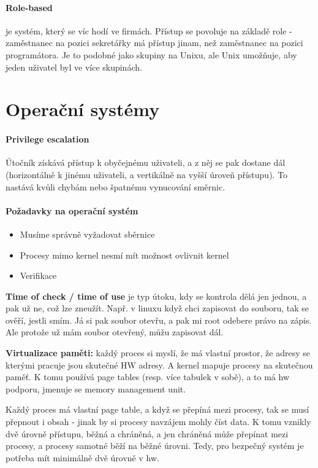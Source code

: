 \paragraph{Role-based} je systém, který se víc hodí ve firmách. Přístup se povoluje na základě role - zaměstnanec na pozici sekretářky má přístup jinam, než zaměstnanec na pozici programátora. Je to podobné jako skupiny na Unixu, ale Unix umožňuje, aby jeden uživatel byl ve více skupinách.




\section{Operační systémy}


\paragraph{Privilege escalation}

Útočník získává přístup k obyčejnému uživateli, a z něj se pak dostane dál (horizontálně k jinému uživateli, a vertikálně na vyšší úroveň přístupu). To nastává kvůli chybám nebo špatnému vynucování směrnic.

\paragraph{Požadavky na operační systém}
\begin{itemize}
\item Musíme správně vyžadovat sběrnice
\item Procesy mimo kernel nesmí mít možnost ovlivnit kernel
\item Verifikace
\end{itemize}

\textbf{Time of check / time of use} je typ útoku, kdy se kontrola dělá jen jednou, a pak už ne, což lze zneužít. Např. v linuxu když chci zapisovat do souboru, tak se ověří, jestli smím. Já si pak soubor otevřu, a pak mi root odebere právo na zápis. Ale protože už mám soubor otevřený, můžu zapisovat dál.

\textbf{Virtualizace paměti:} každý proces si myslí, že má vlastní prostor, že adresy se kterými pracuje jsou skutečné HW adresy. A kernel mapuje procesy na skutečnou paměť. K tomu používá page tables (resp. více tabulek v sobě), a to má hw podporu, jmenuje se memory management unit.

Každý proces má vlastní page table, a když se přepíná mezi procesy, tak se musí přepnout i obsah - jinak by si procesy navzájem mohly číst data. K tomu vznikly dvě úrovně přístupu, běžná a chráněná, a jen chráněná může přepínat mezi procesy, a procesy samotné běží na běžné úrovni. Tedy, pro bezpečný systém je potřeba mít minimálně dvě úrovně v hw.

